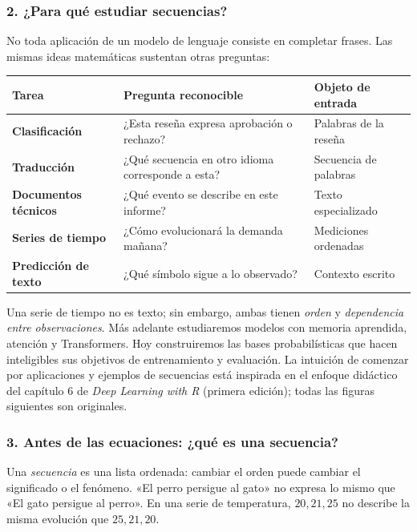 \subsubsection*{2. ¿Para qué estudiar secuencias?}
No toda aplicación de un modelo de lenguaje consiste en completar frases. Las mismas ideas matemáticas sustentan otras preguntas:
\begin{center}
\begin{tabularx}{\textwidth}{>{\bfseries}p{3.0cm}X>{\raggedright\arraybackslash}p{3.4cm}}
\toprule Tarea & Pregunta reconocible & Objeto de entrada\\\midrule
Clasificación & ¿Esta reseña expresa aprobación o rechazo? & Palabras de la reseña\\
Traducción & ¿Qué secuencia en otro idioma corresponde a esta? & Secuencia de palabras\\
Documentos técnicos & ¿Qué evento se describe en este informe? & Texto especializado\\
Series de tiempo & ¿Cómo evolucionará la demanda mañana? & Mediciones ordenadas\\
Predicción de texto & ¿Qué símbolo sigue a lo observado? & Contexto escrito\\\bottomrule
\end{tabularx}
\end{center}
Una serie de tiempo no es texto; sin embargo, ambas tienen \emph{orden} y \emph{dependencia entre observaciones}. Más adelante estudiaremos modelos con memoria aprendida, atención y Transformers. Hoy construiremos las bases probabilísticas que hacen inteligibles sus objetivos de entrenamiento y evaluación. La intuición de comenzar por aplicaciones y ejemplos de secuencias está inspirada en el enfoque didáctico del capítulo 6 de \emph{Deep Learning with R} (primera edición); todas las figuras siguientes son originales.

\subsubsection*{3. Antes de las ecuaciones: ¿qué es una secuencia?}
Una \emph{secuencia} es una lista ordenada: cambiar el orden puede cambiar el significado o el fenómeno. «El perro persigue al gato» no expresa lo mismo que «El gato persigue al perro». En una serie de temperatura, $20,21,25$ no describe la misma evolución que $25,21,20$.

